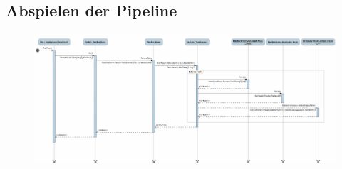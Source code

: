 \subsection{Abspielen der Pipeline}
\begin{figure}[h!]
\begin{center}
\includegraphics[width=0.9\textheight,angle=90]{Diagrams/play.png}
\end{center}
\end{figure}
\newpage


